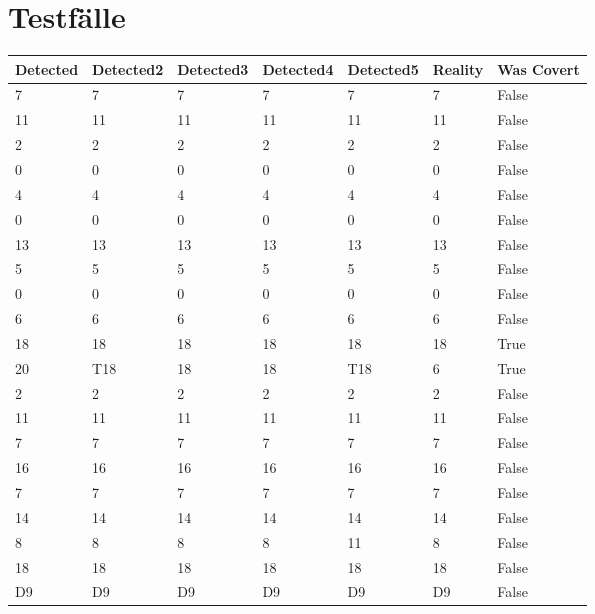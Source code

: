 \chapter{Testfälle}
\label{chap:benchmarks}
\begin{longtable}[htbp]{| p{} | p{} | p{}| p{}| p{}| p{}| p{}|} 
\hline
\multicolumn{1}{|l|}{Detected} & \multicolumn{1}{l|}{Detected2} & \multicolumn{1}{l|}{Detected3} & \multicolumn{1}{l|}{Detected4} & \multicolumn{1}{l|}{Detected5} & \multicolumn{1}{l|}{Reality} & Was Covert \\ \hline
\endhead
7 & 7 & 7 & 7 & 7 & 7 & False \\ \hline
11 & 11 & 11 & 11 & 11 & 11 & False \\ \hline
2 & 2 & 2 & 2 & 2 & 2 & False \\ \hline
0 & 0 & 0 & 0 & 0 & 0 & False \\ \hline
4 & 4 & 4 & 4 & 4 & 4 & False \\ \hline
0 & 0 & 0 & 0 & 0 & 0 & False \\ \hline
13 & 13 & 13 & 13 & 13 & 13 & False \\ \hline
5 & 5 & 5 & 5 & 5 & 5 & False \\ \hline
0 & 0 & 0 & 0 & 0 & 0 & False \\ \hline
6 & 6 & 6 & 6 & 6 & 6 & False \\ \hline
18 & 18 & 18 & 18 & 18 & 18 & True \\ \hline
20 & \multicolumn{1}{l|}{T18} & 18 & 18 & \multicolumn{1}{l|}{T18} & 6 & True \\ \hline
2 & 2 & 2 & 2 & 2 & 2 & False \\ \hline
11 & 11 & 11 & 11 & 11 & 11 & False \\ \hline
7 & 7 & 7 & 7 & 7 & 7 & False \\ \hline
16 & 16 & 16 & 16 & 16 & 16 & False \\ \hline
7 & 7 & 7 & 7 & 7 & 7 & False \\ \hline
14 & 14 & 14 & 14 & 14 & 14 & False \\ \hline
8 & 8 & 8 & 8 & 11 & 8 & False \\ \hline
18 & 18 & 18 & 18 & 18 & 18 & False \\ \hline
\multicolumn{1}{|l|}{D9} & \multicolumn{1}{l|}{D9} & \multicolumn{1}{l|}{D9} & \multicolumn{1}{l|}{D9} & \multicolumn{1}{l|}{D9} & \multicolumn{1}{l|}{D9} & False \\ \hline

\end{longtable}
